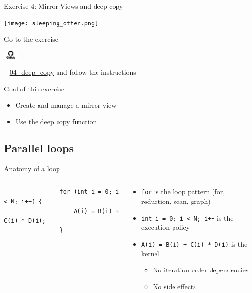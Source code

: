 \documentclass[aspectratio=169]{beamer}
\newcommand{\githublink}[2][2em]{%
    \hspace{-0.25em}%
    \parbox[c][#1][c]{#1}{%
        \includegraphics[width=#1]{GitHub-logo.png}%
    }%
    \hspace{-0.25em}%
    ~%
    #2%
}
\begin{document}

\begin{frame}{Exercise 4: Mirror Views and deep copy}
    \begin{center}
        \texttt{[image: sleeping\_otter.png]}
    \end{center}

    Go to the exercise \githublink{\href{https://github.com/CExA-project/cexa-kokkos-tutorials/tree/main/exercises/04_deep_copy}{04\_deep\_copy}} and follow the instructions

    \begin{block}{Goal of this exercise}
        \begin{itemize}
            \item Create and manage a mirror view
            \item Use the deep copy function
        \end{itemize}
    \end{block}
\end{frame}


\subsection{Parallel loops}


\begin{frame}[fragile]{Anatomy of a loop}
    \begin{columns}
        \begin{column}{0.5\linewidth}
            \begin{verbatim}
                for (int i = 0; i < N; i++) {
                    A(i) = B(i) + C(i) * D(i);
                }
            \end{verbatim}
        \end{column}
        \begin{column}{0.5\linewidth}
            \begin{itemize}
                \item \texttt{for} is the loop pattern (for, reduction, scan, graph)
                \item \texttt{int i = 0; i < N; i++} is the execution policy
                \item \texttt{A(i) = B(i) + C(i) * D(i)} is the kernel
                \begin{itemize}
                    \item No iteration order dependencies
                    \item No side effects
                \end{itemize}
            \end{itemize}
        \end{column}
    \end{columns}
\end{frame}
\end{document}
